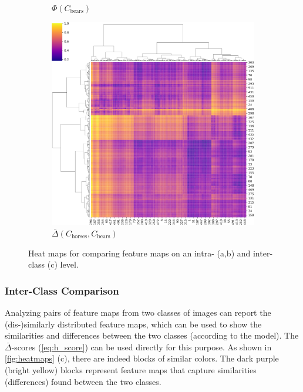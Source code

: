 \begin{figure}
\begin{subfigure}{0.3\textwidth}
        \caption{$\Phi(C_{\text{bears}})$}
    \end{subfigure}
    \begin{subfigure}{0.3\textwidth}
        \centering
        \includegraphics[width=\linewidth]{figures/combined_h_scores_ward_20210804-002107.png}
        \caption{$\bar{\Delta}(C_{\text{horses}}, C_{\text{bears}})$}
    \end{subfigure}
    \caption{Heat maps for comparing feature maps on an intra- (a,b) and inter-class (c) level.}
    \label{fig:heatmaps}
\end{figure}

\subsubsection{Inter-Class Comparison}

Analyzing pairs of feature maps from two classes of images can report the (dis-)similarly distributed feature maps, which can be used to show the similarities and differences between the two classes (according to the model). The $\bar{\Delta}$-scores (\autoref{eq:h_score}) can be used directly for this purpose.
As shown in \autoref{fig:heatmaps} (c), there are indeed blocks of similar colors. The dark purple (bright yellow) blocks represent feature maps that capture similarities (differences) found between the two classes.
